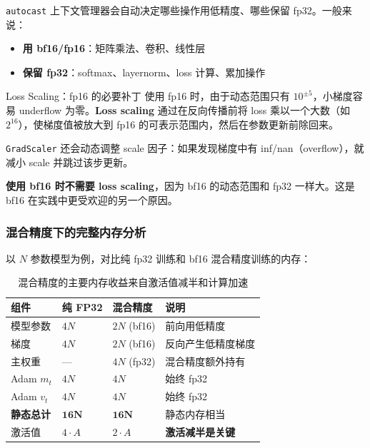 \documentclass[a4paper]{article}
\begin{document}
\texttt{autocast} 上下文管理器会自动决定哪些操作用低精度、哪些保留 fp32。一般来说：
\begin{itemize}
    \item \textbf{用 bf16/fp16}：矩阵乘法、卷积、线性层
    \item \textbf{保留 fp32}：softmax、layernorm、loss 计算、累加操作
\end{itemize}

\begin{warningbox}{Loss Scaling：fp16 的必要补丁}
使用 fp16 时，由于动态范围只有 $10^{\pm 5}$，小梯度容易 underflow 为零。\textbf{Loss scaling} 通过在反向传播前将 loss 乘以一个大数（如 $2^{16}$），使梯度值被放大到 fp16 的可表示范围内，然后在参数更新前除回来。

\texttt{GradScaler} 还会动态调整 scale 因子：如果发现梯度中有 inf/nan（overflow），就减小 scale 并跳过该步更新。

\textbf{使用 bf16 时不需要 loss scaling}，因为 bf16 的动态范围和 fp32 一样大。这是 bf16 在实践中更受欢迎的另一个原因。
\end{warningbox}

\subsubsection{混合精度下的完整内存分析}

以 $N$ 参数模型为例，对比纯 fp32 训练和 bf16 混合精度训练的内存：

\begin{table}[H]
\centering
\begin{tabular}{p{}p{}p{}p{}}
\toprule
\textbf{组件} & \textbf{纯 FP32} & \textbf{混合精度} & \textbf{说明} \\
\midrule
模型参数 & $4N$ & $2N$ (bf16) & 前向用低精度 \\
梯度 & $4N$ & $2N$ (bf16) & 反向产生低精度梯度 \\
主权重 & --- & $4N$ (fp32) & 混合精度额外持有 \\
Adam $m_t$ & $4N$ & $4N$ & 始终 fp32 \\
Adam $v_t$ & $4N$ & $4N$ & 始终 fp32 \\
\midrule
\textbf{静态总计} & $\mathbf{16N}$ & $\mathbf{16N}$ & 静态内存相当 \\
激活值 & $4 \cdot A$ & $2 \cdot A$ & \textbf{激活减半是关键} \\
\bottomrule
\end{tabular}
\caption{混合精度的主要内存收益来自激活值减半和计算加速}
\end{table}
\end{document}

